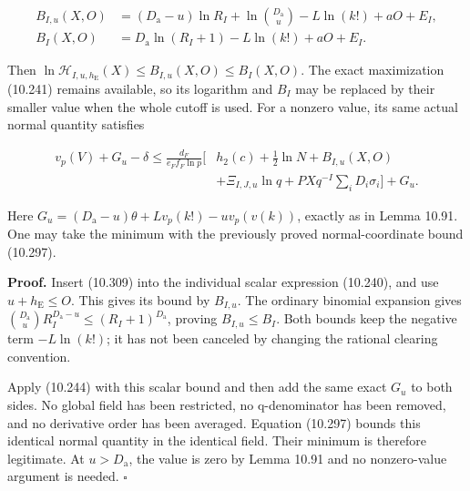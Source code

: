 \documentclass[
  11pt,
  a4paper,
]{article}
\begin{document}
\[
\begin{aligned}
B_{I,u}(X,O)&=(D_{\mathrm a}-u)\ln R_I
 +\ln\binom{D_{\mathrm a}}u-L\ln(k!)+aO+E_I,\\
B_I(X,O)&=D_{\mathrm a}\ln(R_I+1)-L\ln(k!)+aO+E_I.
\end{aligned}
\tag{10.312}
\]

Then
\(\ln\mathcal H_{I,u,h_{\mathrm E}}(X)\le B_{I,u}(X,O)\le B_I(X,O)\).
The exact maximization (10.241) remains available, so its logarithm and
\(B_I\) may be replaced by their smaller value when the whole cutoff is
used. For a nonzero value, its same actual normal quantity satisfies

\[
\begin{aligned}
v_p(V)+G_u-\delta\le
\frac{d_F}{e_Ff_F\ln p}\biggl[
&h_2(c)+\tfrac12\ln N+B_{I,u}(X,O)\\
&+\Xi_{I,J,u}\ln q
+PXq^{-I}\sum_iD_i\sigma_i\biggr]+G_u.
\end{aligned}
\tag{10.313}
\]

Here \(G_u=(D_{\mathrm a}-u)\theta+Lv_p(k!)-u v_p(v(k))\), exactly as in
Lemma 10.91. One may take the minimum with the previously proved
normal-coordinate bound (10.297).

\textbf{Proof.} Insert (10.309) into the individual scalar expression
(10.240), and use \(u+h_{\mathrm E}\le O\). This gives its bound by
\(B_{I,u}\). The ordinary binomial expansion gives
\(\binom{D_{\mathrm a}}uR_I^{D_{\mathrm a}-u}\le(R_I+1)^{D_{\mathrm a}}\),
proving \(B_{I,u}\le B_I\). Both bounds keep the negative term
\(-L\ln(k!)\); it has not been canceled by changing the rational
clearing convention.

Apply (10.244) with this scalar bound and then add the same exact
\(G_u\) to both sides. No global field has been restricted, no
q-denominator has been removed, and no derivative order has been
averaged. Equation (10.297) bounds this identical normal quantity in the
identical field. Their minimum is therefore legitimate. At
\(u>D_{\mathrm a}\), the value is zero by Lemma 10.91 and no
nonzero-value argument is needed. \(\square\)
\end{document}
